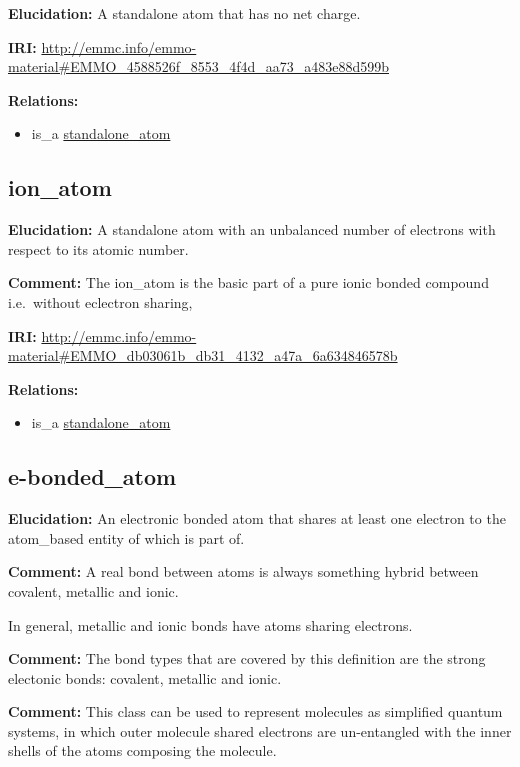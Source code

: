 \documentclass[a4paper,]{report}
\providecommand{\tightlist}{%
  \setlength{\itemsep}{0pt}\setlength{\parskip}{0pt}}
\begin{document}
\textbf{Elucidation:} A standalone atom that has no net charge.

\textbf{IRI:}
\url{http://emmc.info/emmo-material\#EMMO_4588526f_8553_4f4d_aa73_a483e88d599b}

\textbf{Relations:}

\begin{itemize}
\tightlist
\item
  is\_a \protect\hyperlink{standalone_atom}{standalone\_atom}
\end{itemize}

\hypertarget{ion_atom-1}{%
\subsection{ion\_atom}\label{ion_atom-1}}

\textbf{Elucidation:} A standalone atom with an unbalanced number of
electrons with respect to its atomic number.

\textbf{Comment:} The ion\_atom is the basic part of a pure ionic bonded
compound i.e.~without eclectron sharing,

\textbf{IRI:}
\url{http://emmc.info/emmo-material\#EMMO_db03061b_db31_4132_a47a_6a634846578b}

\textbf{Relations:}

\begin{itemize}
\tightlist
\item
  is\_a \protect\hyperlink{standalone_atom}{standalone\_atom}
\end{itemize}

\hypertarget{e-bonded_atom-1}{%
\subsection{e-bonded\_atom}\label{e-bonded_atom-1}}

\textbf{Elucidation:} An electronic bonded atom that shares at least one
electron to the atom\_based entity of which is part of.

\textbf{Comment:} A real bond between atoms is always something hybrid
between covalent, metallic and ionic.

In general, metallic and ionic bonds have atoms sharing electrons.

\textbf{Comment:} The bond types that are covered by this definition are
the strong electonic bonds: covalent, metallic and ionic.

\textbf{Comment:} This class can be used to represent molecules as
simplified quantum systems, in which outer molecule shared electrons are
un-entangled with the inner shells of the atoms composing the molecule.
\end{document}
